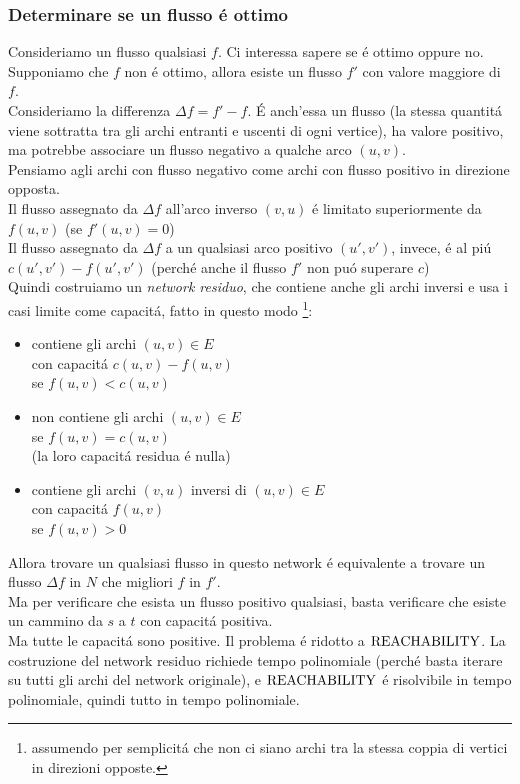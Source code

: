 \subsubsection*{Determinare se un flusso é ottimo}
Consideriamo un flusso qualsiasi $f$. Ci interessa sapere se é ottimo oppure no. \\
Supponiamo che $f$ non é ottimo, allora esiste un flusso $f'$ con valore maggiore di $f$. \\
Consideriamo la differenza $\Delta f = f' - f$. É anch'essa un flusso 
(la stessa quantitá viene sottratta tra gli archi entranti e uscenti di ogni vertice), 
ha valore positivo, ma potrebbe associare un flusso negativo a qualche arco $(u,v)$. \\
Pensiamo agli archi con flusso negativo come archi con flusso positivo in direzione opposta. \\
Il flusso assegnato da $\Delta f$ all'arco inverso $(v,u)$ é limitato superiormente da $f(u,v)$ 
(se $f'(u,v) = 0$) \\
Il flusso assegnato da $\Delta f$ a un qualsiasi arco positivo $(u', v')$, invece, é al piú $c(u', v') - f(u', v')$
(perché anche il flusso $f'$ non puó superare $c$) \\
Quindi costruiamo un \textit{network residuo}, 
che contiene anche gli archi inversi e usa i casi limite come capacitá,
fatto in questo modo
\footnote{assumendo per semplicitá che non ci siano archi 
tra la stessa coppia di vertici in direzioni opposte.}:
\begin{itemize}
	\item contiene gli archi $(u,v) \in E$ \\ 
    con capacitá $c(u,v) - f(u,v)$ \\
    se $f(u,v) < c(u,v)$
	\item non contiene gli archi $(u,v) \in E$ \\
    se $f(u, v) = c(u, v)$ \\
    (la loro capacitá residua é nulla)
	\item contiene gli archi $(v,u)$ inversi di $(u,v) \in E$ \\
    con capacitá $f(u,v)$ \\
    se $f(u,v) > 0$
\end{itemize}
Allora trovare un qualsiasi flusso in questo network é equivalente a trovare 
un flusso $\Delta f$ in $N$ che migliori $f$ in $f'$. \\
Ma per verificare che esista un flusso positivo qualsiasi, basta verificare 
che esiste un cammino da $s$ a $t$ con capacitá positiva. \\
Ma tutte le capacitá sono positive. Il problema é ridotto a $\text{REACHABILITY}$.
La costruzione del network residuo richiede tempo polinomiale
(perché basta iterare su tutti gli archi del network originale), 
e $\text{REACHABILITY}$ é risolvibile in tempo polinomiale, 
quindi tutto in tempo polinomiale.

